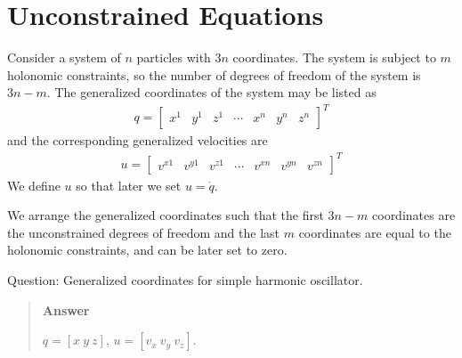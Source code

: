 \documentclass[
  letterpaper,
  DIV=11,
  numbers=noendperiod]{scrreprt}
\begin{document}
\section{Unconstrained Equations}\label{unconstrained-equations}

Consider a system of \(n\) particles with \(3n\) coordinates. The system
is subject to \(m\) holonomic constraints, so the number of degrees of
freedom of the system is \(3n-m\). The generalized coordinates of the
system may be listed as \begin{align}
    q =
    \begin{bmatrix}
        x^1 & y^1 & z^1 & \cdots & x^n & y^n & z^n
    \end{bmatrix}^T
\end{align} and the corresponding generalized velocities are
\begin{align}
    u =
    \begin{bmatrix}
        v^{x1} & v^{y1} & v^{z1} & \cdots & v^{xn} & v^{yn} & v^{zn}
    \end{bmatrix}^T
\end{align} We define \(u\) so that later we set \(u = \dot{q}\).

We arrange the generalized coordinates such that the first \(3n-m\)
coordinates are the unconstrained degrees of freedom and the last \(m\)
coordinates are equal to the holonomic constraints, and can be later set
to zero.

\begin{tcolorbox}[enhanced jigsaw, arc=.35mm, bottomrule=.15mm, bottomtitle=1mm, breakable, colback=white, colbacktitle=quarto-callout-tip-color!10!white, colframe=quarto-callout-tip-color-frame, coltitle=black, left=2mm, leftrule=.75mm, opacityback=0, opacitybacktitle=0.6, rightrule=.15mm, title=\textcolor{quarto-callout-tip-color}{\faLightbulb}\hspace{0.5em}{Think!}, titlerule=0mm, toprule=.15mm, toptitle=1mm]

Question: Generalized coordinates for simple harmonic oscillator.

\begin{quote}
\textbf{Answer}

\(q = [x\ y\ z]\), \(u = [v_x\ v_y\ v_z]\).
\end{quote}

\end{tcolorbox}
\end{document}
